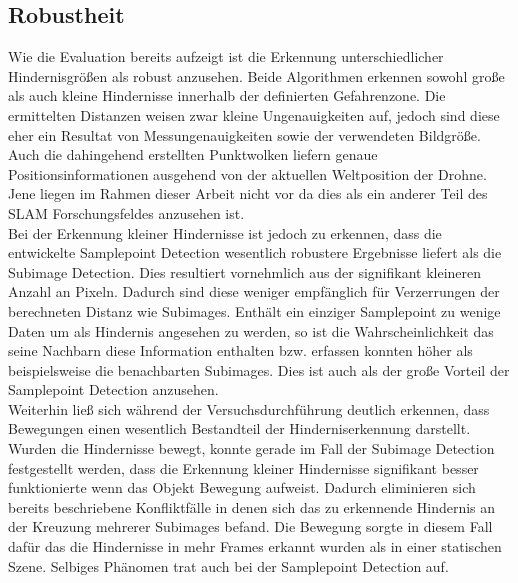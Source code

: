 
   

\subsection{Robustheit}
\label{subsec:discussion_robustness}
Wie die Evaluation bereits aufzeigt ist die Erkennung unterschiedlicher Hindernisgrößen als robust anzusehen. Beide Algorithmen erkennen sowohl große als auch kleine Hindernisse innerhalb der definierten Gefahrenzone. Die ermittelten Distanzen weisen zwar kleine Ungenauigkeiten auf, jedoch sind diese eher ein Resultat von Messungenauigkeiten sowie der verwendeten Bildgröße. Auch die dahingehend erstellten Punktwolken liefern genaue Positionsinformationen ausgehend von der aktuellen Weltposition der Drohne. Jene liegen im Rahmen dieser Arbeit nicht vor da dies als ein anderer Teil des SLAM Forschungsfeldes anzusehen ist.\\

\noindent
Bei der Erkennung kleiner Hindernisse ist jedoch zu erkennen, dass die entwickelte Samplepoint Detection wesentlich robustere Ergebnisse liefert als die Subimage Detection. Dies resultiert vornehmlich aus der signifikant kleineren Anzahl an Pixeln. Dadurch sind diese weniger empfänglich für Verzerrungen der berechneten Distanz wie Subimages. Enthält ein einziger Samplepoint zu wenige Daten um als Hindernis angesehen zu werden, so ist die Wahrscheinlichkeit das seine Nachbarn diese Information enthalten bzw. erfassen konnten höher als beispielsweise die benachbarten Subimages. Dies ist auch als der große Vorteil der Samplepoint Detection anzusehen.\\

\noindent
Weiterhin ließ sich während der Versuchsdurchführung deutlich erkennen, dass Bewegungen einen wesentlich Bestandteil der Hinderniserkennung darstellt. Wurden die Hindernisse bewegt, konnte gerade im Fall der Subimage Detection festgestellt werden, dass die Erkennung kleiner Hindernisse signifikant besser funktionierte wenn das Objekt Bewegung aufweist. Dadurch eliminieren sich bereits beschriebene Konfliktfälle in denen sich das zu erkennende Hindernis an der Kreuzung mehrerer Subimages befand. Die Bewegung sorgte in diesem Fall dafür das die Hindernisse in mehr Frames erkannt wurden als in einer statischen Szene. Selbiges Phänomen trat auch bei der Samplepoint Detection auf.\\

